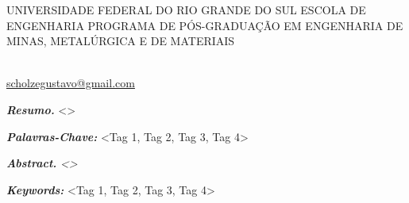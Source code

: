 \newpage
\large
\begin{center}
\large
UNIVERSIDADE FEDERAL DO RIO GRANDE DO SUL \linebreak
ESCOLA DE ENGENHARIA\linebreak
PROGRAMA DE PÓS-GRADUAÇÃO EM ENGENHARIA DE MINAS, METALÚRGICA E DE MATERIAIS
\end{center}
\raggedright
\vspace*{\baselineskip} %
\textbf{\imprimirtitulo}
\vspace*{2\baselineskip} %

\newcommand{\email}{scholzegustavo@gmail.com}
\begin{lmarginbox}
\normalsize
\textbf{\imprimirautor}\\
\href{mailto:\email}{\email}

\vspace*{\baselineskip} %
\textbf{\textit{Resumo.}} <\lipsum[1]> 

\vspace*{\baselineskip} %
\textbf{\textit{Palavras-Chave:}}
<Tag 1, Tag 2, Tag 3, Tag 4>

\vspace*{\baselineskip} %
\textbf{\textit{Abstract.}} \textit{<\lipsum[1]>}

\vspace*{\baselineskip} %
\textbf{\textit{Keywords:}} <Tag 1, Tag 2, Tag 3, Tag 4>

\end{lmarginbox}